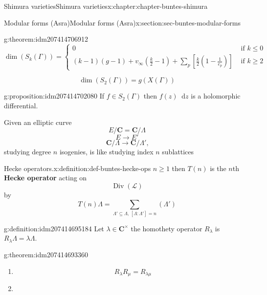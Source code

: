 \documentclass[oneside,10pt,]{book}
\newcommand{\terminology}[1]{\textbf{#1}}
\numberwithin{equation}{section}
\newcommand{\diff}{\mathop{}\!\mathrm{d}}
\newcommand{\CC}{\mathbf{C}}
\DeclareMathOperator{\divisors}{Div}
\newcommand{\amp}{&}
\begin{document}
\begin{chapterptx}{Shimura varieties}{}{Shimura varieties}{}{}{x:chapter:chapter-buntes-shimura}
\begin{sectionptx}{Modular forms (Asra)}{}{Modular forms (Asra)}{}{}{x:section:sec-buntes-modular-forms}
\begin{theorem}{}{}{g:theorem:idm207414706912}
\begin{equation*}
\dim(S_k(\Gamma)) =
\begin{cases}
0 \amp \text{ if } k \le 0 \\
(k-1)(g-1) + v_\infty (\frac k2 - 1) + \sum_p [\frac k2 (1- \frac{1}{e_p})] \amp \text{ if } k \ge 2
\end{cases}
\end{equation*}
%
\end{theorem}
%
\begin{equation*}
\dim(S_2(\Gamma)) = g(X(\Gamma))
\end{equation*}
%
\begin{proposition}{}{}{g:proposition:idm207414702080}%
If \(f \in S_2(\Gamma)\) then \(f(z) \diff z\) is a holomorphic differential.%
\end{proposition}
Given an elliptic curve%
\begin{equation*}
E/  \CC = \CC/\Lambda
\end{equation*}
%
\begin{equation*}
E \to E'
\end{equation*}
%
\begin{equation*}
\CC/\Lambda \to \CC/\Lambda'\text{,}
\end{equation*}
studying degree \(n\) isogenies, is like studying index  \(n \) sublattices%
\begin{definition}{Hecke operators.}{x:definition:def-buntes-hecke-ops}%
\(n \ge 1\) then \(T(n)\) is the  \(n\)th \terminology{Hecke operator} acting on%
\begin{equation*}
\divisors (\mathcal L)
\end{equation*}
by%
\begin{equation*}
T(n) \Lambda = \sum_{\Lambda' \subseteq \Lambda,\,[\Lambda : \Lambda'] = n} (\Lambda')
\end{equation*}
%
\end{definition}
\begin{definition}{}{g:definition:idm207414695184}%
Let \(\lambda \in \CC^\times\) the homothety operator \(R_\lambda\) is \(R_\lambda \Lambda = \lambda\Lambda\).%
\end{definition}
\begin{theorem}{}{}{g:theorem:idm207414693360}%
%
\begin{enumerate}
\item{}%
\begin{equation*}
R_\lambda R_\mu = R_{\lambda\mu}
\end{equation*}
%
\item{}%

\end{enumerate}
\end{theorem}
\end{sectionptx}
\end{chapterptx}
\end{document}
